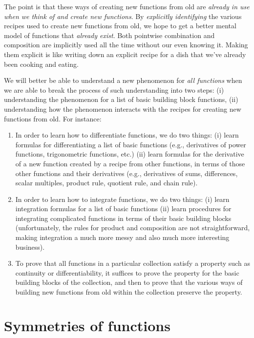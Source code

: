 \documentclass{amsart}
\begin{document}
The point is that these ways of creating new functions from old are
{\em already in use when we think of and create new functions}. By
{\em explicitly identifying} the various recipes used to create new
functions from old, we hope to get a better mental model of functions
that {\em already exist}. Both pointwise combination and composition
are implicitly used all the time without our even knowing it. Making
them explicit is like writing down an explicit recipe for a dish that
we've already been cooking and eating.

We will better be able to understand a new phenomenon for {\em all
functions} when we are able to break the process of such understanding
into two steps: (i) understanding the phenomenon for a list of basic
building block functions, (ii) understanding how the phenomenon
interacts with the recipes for creating new functions from old. For instance:

\begin{enumerate}
\item In order to learn how to differentiate functions, we do two
  things: (i) learn formulas for differentiating a list of basic
  functions (e.g., derivatives of power functions, trigonometric
  functions, etc.) (ii) learn formulas for the derivative of a new
  function created by a recipe from other functions, in terms of those
  other functions and their derivatives (e.g., derivatives of sums,
  differences, scalar multiples, product rule, quotient rule, and
  chain rule).
\item In order to learn how to integrate functions, we do two things:
  (i) learn integration formulas for a list of basic functions (ii)
  learn procedures for integrating complicated functions in terms of
  their basic building blocks (unfortunately, the rules for product
  and composition are not straightforward, making integration a much
  more messy and also much more interesting business).
\item To prove that all functions in a particular collection satisfy a
  property such as continuity or differentiability, it suffices to
  prove the property for the basic building blocks of the collection,
  and then to prove that the various ways of building new functions
  from old within the collection preserve the property.
\end{enumerate}
\section{Symmetries of functions}
\end{document}
